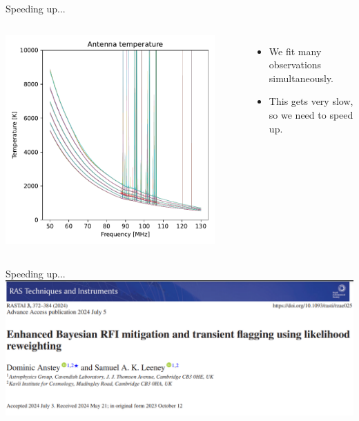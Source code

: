 \documentclass[aspectratio=169]{beamer}
\begin{document}
\begin{frame}{Speeding up...}
  \begin{columns}
      \centering
      \includegraphics[width=0.9\textwidth]{images/antenna_data_all.pdf} %
      \begin{itemize}
        \item We fit many observations simultaneously.
        \item This gets very slow, so we need to speed up.
      \end{itemize}
  \end{columns}
\end{frame}

\begin{frame}{Speeding up...}
  \centering \includegraphics[width=1\textwidth]{images/speedingup.png}
\end{frame}
\end{document}

